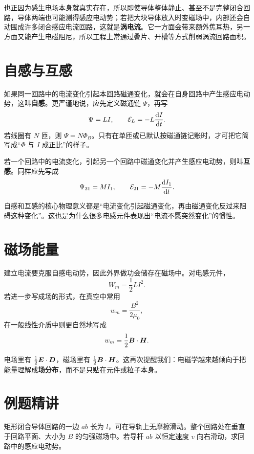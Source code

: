 \documentclass[lang=cn,11pt]{elegantbook}
\newcommand{\bridge}[1]{\begin{note}#1\end{note}}
\begin{document}
\begin{remark}
也正因为感生电场本身就真实存在，所以即使导体整体静止、甚至不是完整闭合回路，导体两端也可能测得感应电动势；若把大块导体放入时变磁场中，内部还会自动围成许多闭合感应电流回路，这就是\textbf{涡电流}。它一方面会带来额外焦耳热，另一方面又能产生电磁阻尼，所以工程上常通过叠片、开槽等方式削弱涡流回路面积。
\end{remark}

\section{自感与互感}

如果同一回路中的电流变化引起本回路磁通变化，就会在自身回路中产生感应电动势，这叫\textbf{自感}。更严谨地说，应先定义磁通链 \(\Psi\)，再写
\[
\Psi=LI,
\qquad
\mathcal{E}_L=-L\dv{I}{t}.
\]
若线圈有 \(N\) 匝，则 \(\Psi=N\Phi_B\)。只有在单匝或已默认按磁通链记账时，才可把它简写成“\(\Phi\) 与 \(I\) 成正比”的样子。

若一个回路中的电流变化，引起另一个回路中磁通变化并产生感应电动势，则叫\textbf{互感}。同样应先写成
\[
\Psi_{21}=MI_1,
\qquad
\mathcal{E}_{21}=-M\dv{I_1}{t}.
\]

\begin{note}
自感和互感的核心物理意义都是“电流变化引起磁通变化，再由磁通变化反过来阻碍这种变化”。这也是为什么很多电感元件表现出“电流不愿突然变化”的惯性。
\end{note}

\section{磁场能量}

建立电流要克服自感电动势，因此外界做功会储存在磁场中。对电感元件，
\[
W_m=\frac{1}{2}LI^2.
\]
若进一步写成场的形式，在真空中常用
\[
w_m=\frac{B^2}{2\mu_0},
\]
在一般线性介质中则更自然地写成
\[
w_m=\frac{1}{2}\vb*{B}\cdot \vb*{H}.
\]

\bridge{电场里有 \(\frac12 \vb*{E}\cdot \vb*{D}\)，磁场里有 \(\frac12 \vb*{B}\cdot \vb*{H}\)。这再次提醒我们：电磁学越来越倾向于把能量理解成\textbf{场分布}，而不是只贴在元件或粒子本身。}

\section{例题精讲}

\begin{example}[滑动导杆的感应电动势]
矩形闭合导体回路的一边 \(ab\) 长为 \(l\)，可在导轨上无摩擦滑动。整个回路处在垂直于回路平面、大小为 \(B\) 的匀强磁场中。若导杆 \(ab\) 以恒定速度 \(v\) 向右滑动，求回路中的感应电动势。
\end{example}
\end{document}
